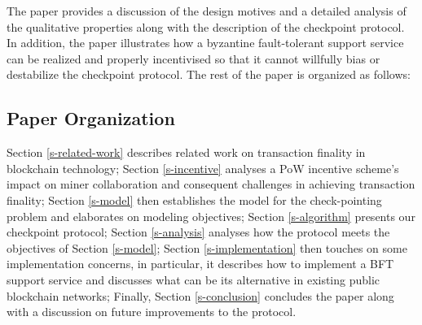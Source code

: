 The paper provides a discussion of the design motives and a detailed analysis of the qualitative properties along with the description of the checkpoint protocol. In addition, the paper illustrates how a byzantine fault-tolerant support service can be realized and properly incentivised so that it cannot willfully bias or destabilize the checkpoint protocol. The rest of the paper is organized as follows:

\subsection{Paper Organization}
Section \ref{s-related-work} describes related work on transaction finality in blockchain technology; Section \ref{s-incentive} analyses a PoW incentive scheme's impact on miner collaboration and consequent challenges in achieving transaction finality; Section \ref{s-model} then establishes the model for the check-pointing problem and elaborates on modeling objectives; Section \ref{s-algorithm} presents our checkpoint protocol; Section \ref{s-analysis} analyses how the protocol meets the objectives of Section \ref{s-model}; Section \ref{s-implementation} then touches on some implementation concerns, in particular, it describes how to implement a BFT support service and discusses what can be its alternative in existing public blockchain networks; Finally, Section \ref{s-conclusion} concludes the paper along with a discussion on future improvements to the protocol.  
